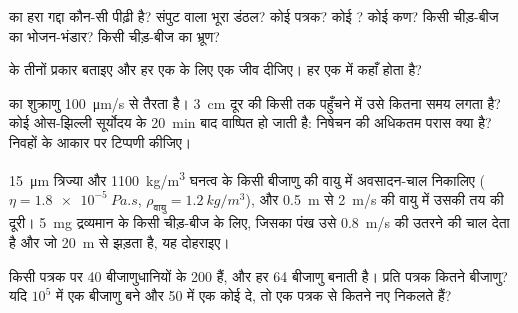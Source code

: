 \begin{exercise}[$\star$]\label{exo:b2:plant-life-cycles:3}
 का हरा गद्दा कौन-सी पीढ़ी है? संपुट वाला भूरा डंठल?
कोई  पत्रक? कोई ? कोई  कण? किसी चीड़-बीज
का भोजन-भंडार? किसी चीड़-बीज का भ्रूण?
\end{exercise}

\begin{exercise}[$\star$]\label{exo:b2:plant-life-cycles:4}
 के तीनों प्रकार बताइए और हर एक के लिए एक जीव दीजिए।
हर एक में  कहाँ होता है?
\end{exercise}

\begin{exercise}[$\star\star$]\label{exo:b2:plant-life-cycles:5}
 का शुक्राणु \qty{100}{\micro m/s} से तैरता है। \qty{3}{cm} दूर की
किसी  तक पहुँचने में उसे कितना समय लगता है? कोई ओस-झिल्ली
सूर्योदय के \qty{20}{min} बाद वाष्पित हो जाती है: निषेचन की अधिकतम परास
क्या है?  निवहों के आकार पर टिप्पणी कीजिए।
\end{exercise}

\begin{exercise}[$\star\star$]\label{exo:b2:plant-life-cycles:6}
\qty{15}{\micro m} त्रिज्या और \qty{1100}{kg/m^3} घनत्व के किसी
 बीजाणु की वायु में अवसादन-चाल निकालिए ($\eta =
\qty{1.8e-5}{Pa.s}$, $\rho_{\text{वायु}} = \qty{1.2}{kg/m^3}$), और
\qty{0.5}{m} से \qty{2}{m/s} की वायु में उसकी तय की दूरी।
\qty{5}{mg} द्रव्यमान के किसी चीड़-बीज के लिए, जिसका पंख उसे
\qty{0.8}{m/s} की उतरने की चाल देता है और जो \qty{20}{m} से झड़ता है, यह दोहराइए।
\end{exercise}

\begin{exercise}[$\star\star$]\label{exo:b2:plant-life-cycles:7}
किसी  पत्रक पर \num{40} बीजाणुधानियों के \num{200}  हैं, और हर
 \num{64} बीजाणु बनाती है। प्रति पत्रक कितने बीजाणु? यदि
$10^{5}$ में एक बीजाणु  बने और \num{50} में एक 
कोई  दे, तो एक पत्रक से कितने नए 
निकलते हैं?
\end{exercise}

